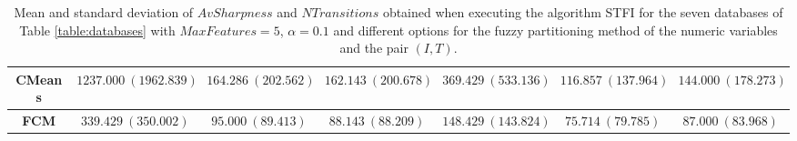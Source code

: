 \begin{table}[H]
{{\begin{tabular}{|c|c|c|c|c|c|c|}
				\multicolumn{1}{|c|}{\textbf{CMeans}}  & \multicolumn{1}{c|}{$1237.000~(1962.839)$}                & \multicolumn{1}{c|}{$164.286~(202.562)$} & \multicolumn{1}{c|}{$162.143~( 200.678)$}                & \multicolumn{1}{c|}{$369.429~(533.136)$}                & \multicolumn{1}{c|}{$116.857~(137.964)$} &  $144.000~(178.273)$               \\ \hline
				\multicolumn{1}{|c|}{\textbf{FCM}}     & \multicolumn{1}{c|}{$339.429~(350.002)$}                & \multicolumn{1}{c|}{$95.000~(89.413)$}    & \multicolumn{1}{c|}{$88.143~(88.209)$}                & \multicolumn{1}{c|}{$148.429~(143.824)$}                & \multicolumn{1}{c|}{$75.714~( 79.785)$}                &         $87.000~(83.968)$        \\ \hline
			\end{tabular}
		}
	}
	
	\caption{Mean and standard deviation of $AvSharpness$ and $NTransitions$ obtained when executing the algorithm STFI for the seven databases of Table \ref{table:databases} with $MaxFeatures=5$, $\alpha=0.1$ and different options for the fuzzy partitioning method of the numeric variables and the pair $(I,T)$.} \label{table:PartvsOp:STFI}
\end{table}

